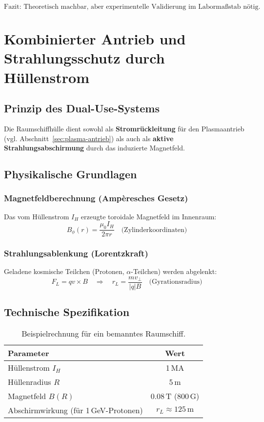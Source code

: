 \begin{equation}
    \text{Fazit: } \boxed{\text{Theoretisch machbar, aber experimentelle Validierung im Labormaßstab nötig.}}
\end{equation}

\section{Kombinierter Antrieb und Strahlungsschutz durch Hüllenstrom}
\label{sec:hullenstrom}

\subsection{Prinzip des Dual-Use-Systems}
Die Raumschiffhülle dient sowohl als \textbf{Stromrückleitung} für den Plasmaantrieb (vgl. Abschnitt~\ref{sec:plasma-antrieb}) als auch als \textbf{aktive Strahlungsabschirmung} durch das induzierte Magnetfeld. 

\subsection{Physikalische Grundlagen}
\subsubsection*{Magnetfeldberechnung (Ampèresches Gesetz)}
Das vom Hüllenstrom $I_H$ erzeugte toroidale Magnetfeld im Innenraum:
\begin{equation}
    B_\phi(r) = \frac{\mu_0 I_H}{2\pi r} \quad \text{(Zylinderkoordinaten)}
    \label{eq:bfeld}
\end{equation}

\subsubsection*{Strahlungsablenkung (Lorentzkraft)}
Geladene kosmische Teilchen (Protonen, $\alpha$-Teilchen) werden abgelenkt:
\begin{equation}
    F_L = q v \times B \quad \Rightarrow \quad r_L = \frac{m v_\perp}{|q| B} \quad \text{(Gyrationsradius)}
    \label{eq:lorentz}
\end{equation}

\subsection{Technische Spezifikation}
\begin{table}[ht]
    \centering
    \begin{tabular}{lc}
        \toprule
        \textbf{Parameter} & \textbf{Wert} \\
        \midrule
        Hüllenstrom $I_H$ & 1\,MA \\
        Hüllenradius $R$ & 5\,m \\
        Magnetfeld $B(R)$ & 0.08\,T (800\,G) \\
        Abschirmwirkung (für 1\,GeV-Protonen) & $r_L \approx 125\,\text{m}$ \\
        \bottomrule
    \end{tabular}
    \caption{Beispielrechnung für ein bemanntes Raumschiff.}
    \label{tab:specs}
\end{table}


